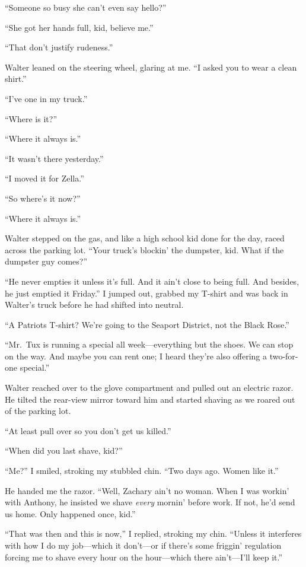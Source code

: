``Someone so busy she can't even say hello?''

``She got her hands full, kid, believe me.''

``That don't justify rudeness.''

Walter leaned on the steering wheel, glaring at me. ``I asked you to
wear a clean shirt.''

``I've one in my truck.''

``Where is it?''

``Where it always is.''

``It wasn't there yesterday.''

``I moved it for Zella.''

``So where's it now?''

``Where it always is.''

Walter stepped on the gas, and like a high school kid done for the day,
raced across the parking lot. ``Your truck's blockin' the dumpster, kid.
What if the dumpster guy comes?''

``He never empties it unless it's full. And it ain't close to being
full. And besides, he just emptied it Friday.'' I jumped out, grabbed my
T-shirt and was back in Walter's truck before he had shifted into
neutral.

``A Patriots T-shirt? We're going to the Seaport District, not the Black
Rose.''

``Mr.~Tux is running a special all week---everything but the shoes. We
can stop on the way. And maybe you can rent one; I heard they're also
offering a two-for-one special.''

Walter reached over to the glove compartment and pulled out an electric
razor. He tilted the rear-view mirror toward him and started shaving as
we roared out of the parking lot.

``At least pull over so you don't get us killed.''

``When did you last shave, kid?''

``Me?'' I smiled, stroking my stubbled chin. ``Two days ago. Women like
it.''

He handed me the razor. ``Well, Zachary ain't no woman. When I was
workin' with Anthony, he insisted we shave \emph{every} mornin' before
work. If not, he'd send us home. Only happened once, kid.''

``That was then and this is now,'' I replied, stroking my chin. ``Unless
it interferes with how I do my job---which it don't---or if there's some
friggin' regulation forcing me to shave every hour on the hour---which
there ain't---I'll keep it.''

